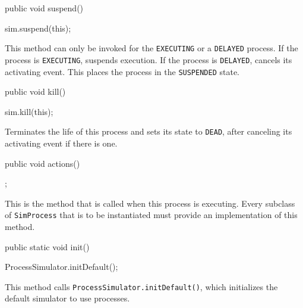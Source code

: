 \begin{code}

   public void suspend() \begin{hide} {
      sim.suspend(this);
   } \end{hide}
\end{code}
  \begin{tabb} This method can only be invoked for the \texttt{EXECUTING}
   or a \texttt{DELAYED} process.
   If the process is \texttt{EXECUTING}, suspends execution.
   If the process is \texttt{DELAYED}, cancels its activating event.
   This places the process in the \texttt{SUSPENDED} state.
  \end{tabb}
\begin{code}

   public void kill() \begin{hide} {
      sim.kill(this);
   } \end{hide}
\end{code}
  \begin{tabb}  Terminates the life of this process and sets its state to
   \texttt{DEAD}, after canceling its activating event if there is one.
  \end{tabb}
\begin{code}

   public void actions()\begin{hide} { }; \end{hide}
\end{code}
  \begin{tabb}  This is the method that is called when this process is
   executing. Every subclass of \texttt{SimProcess} that is to be
    instantiated must provide an implementation of this method.
  \end{tabb}
\begin{code}

   public static void init() \begin{hide} {
      ProcessSimulator.initDefault();
   } \end{hide}
\end{code}
  \begin{tabb}  This method calls \texttt{ProcessSimulator.initDefault()},
    which initializes the default simulator to use processes.
  \end{tabb}
\begin{code} \begin{hide}
}\end{hide}
\end{code}
